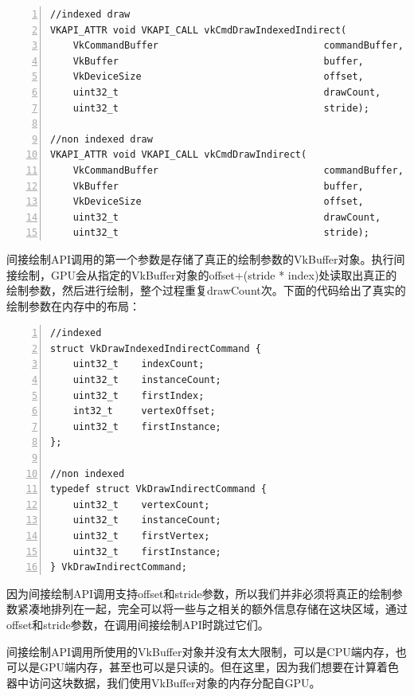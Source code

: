 \documentclass{ctexart}
\begin{document}
\begin{lstlisting}[language={[ANSI]C},keywordstyle=\color{blue!70},commentstyle=\color{red!50!green!50!blue!50},frame=shadowbox, rulesepcolor=\color{red!20!green!20!blue!20},basicstyle=\small,numbers=left, numberstyle=\tiny,breaklines=true]
//indexed draw
VKAPI_ATTR void VKAPI_CALL vkCmdDrawIndexedIndirect(
	VkCommandBuffer                             commandBuffer,
	VkBuffer                                    buffer,
	VkDeviceSize                                offset,
	uint32_t                                    drawCount,
	uint32_t                                    stride);

//non indexed draw
VKAPI_ATTR void VKAPI_CALL vkCmdDrawIndirect(
	VkCommandBuffer                             commandBuffer,
	VkBuffer                                    buffer,
	VkDeviceSize                                offset,
	uint32_t                                    drawCount,
	uint32_t                                    stride);
\end{lstlisting}

间接绘制API调用的第一个参数是存储了真正的绘制参数的VkBuffer对象。执行间接绘制，GPU会从指定的VkBuffer对象的offset+(stride * index)处读取出真正的绘制参数，然后进行绘制，整个过程重复drawCount次。下面的代码给出了真实的绘制参数在内存中的布局：

\begin{lstlisting}[language={[ANSI]C},keywordstyle=\color{blue!70},commentstyle=\color{red!50!green!50!blue!50},frame=shadowbox, rulesepcolor=\color{red!20!green!20!blue!20},basicstyle=\small,numbers=left, numberstyle=\tiny,breaklines=true]
//indexed 
struct VkDrawIndexedIndirectCommand {
	uint32_t    indexCount;
	uint32_t    instanceCount;
	uint32_t    firstIndex;
	int32_t     vertexOffset;
	uint32_t    firstInstance;
};

//non indexed
typedef struct VkDrawIndirectCommand {
	uint32_t    vertexCount;
	uint32_t    instanceCount;
	uint32_t    firstVertex;
	uint32_t    firstInstance;
} VkDrawIndirectCommand;
\end{lstlisting}

因为间接绘制API调用支持offset和stride参数，所以我们并非必须将真正的绘制参数紧凑地排列在一起，完全可以将一些与之相关的额外信息存储在这块区域，通过offset和stride参数，在调用间接绘制API时跳过它们。

间接绘制API调用所使用的VkBuffer对象并没有太大限制，可以是CPU端内存，也可以是GPU端内存，甚至也可以是只读的。但在这里，因为我们想要在计算着色器中访问这块数据，我们使用VkBuffer对象的内存分配自GPU。
\end{document}
